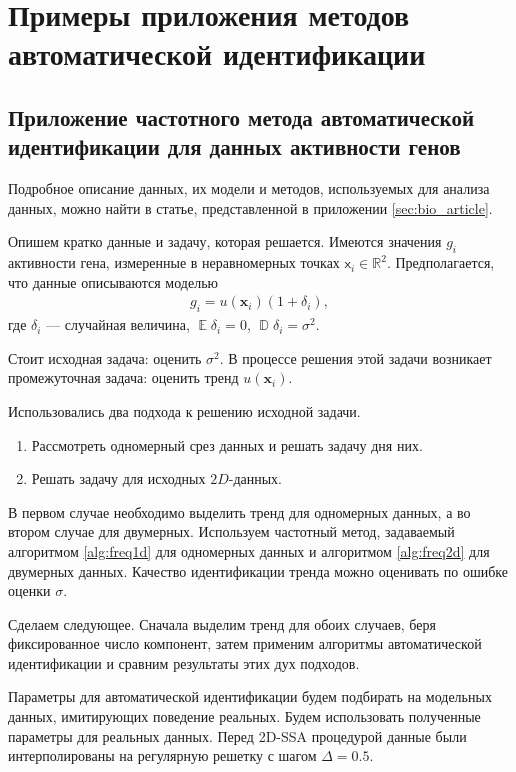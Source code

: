 \documentclass[specialist,
               substylefile = spbu.rtx,
               subf,href,colorlinks=true, 12pt]{disser}
\DeclareMathOperator{\D}{\mathbb{D}}
\def\E{\mathop{\mathbb{E}}}
\begin{document}
\chapter{Примеры приложения методов автоматической идентификации}
\label{sec:applications_gene}

\section{Приложение частотного метода автоматической идентификации для данных активности генов}

Подробное описание данных, их модели и методов, используемых для анализа данных, можно найти в статье, представленной в приложении \ref{sec:bio_article}.

Опишем кратко данные и задачу, которая решается. Имеются значения $g_i$ активности гена, измеренные в неравномерных точках  $\mathsf{x}_i \in \mathbb{R}^2$.
Предполагается, что данные описываются моделью
\begin{eqnarray*}
g_i = u(\mathbf{x}_i)(1 + \delta_i),
\end{eqnarray*}
где $\delta_i$ --- случайная величина, $\E\delta_i=0$, $\D\delta_i=\sigma^2$.

Стоит исходная задача: оценить $\sigma^2$. В процессе решения этой задачи возникает промежуточная задача: оценить тренд $ u(\mathbf{x}_i)$.

Использовались два подхода к решению исходной задачи.
\begin{enumerate}
  \item Рассмотреть одномерный срез данных и решать задачу дня них.
  \item Решать задачу для исходных $2D$-данных.
\end{enumerate}
В первом случае необходимо выделить тренд для одномерных данных, а во втором случае для двумерных.
Используем частотный метод, задаваемый алгоритмом \ref{alg:freq1d} для одномерных данных и алгоритмом \ref{alg:freq2d} для двумерных данных.
Качество идентификации тренда можно оценивать по ошибке оценки $\sigma$.

Сделаем следующее. Сначала выделим тренд для обоих случаев, беря фиксированное число компонент, затем применим алгоритмы автоматической идентификации и сравним результаты этих дух подходов.

Параметры для автоматической идентификации будем подбирать на модельных данных,
имитирующих поведение реальных. Будем использовать полученные параметры для реальных данных.
Перед 2D-SSA процедурой данные были интерполированы на регулярную решетку с шагом $\Delta = 0.5$.
\end{document}
